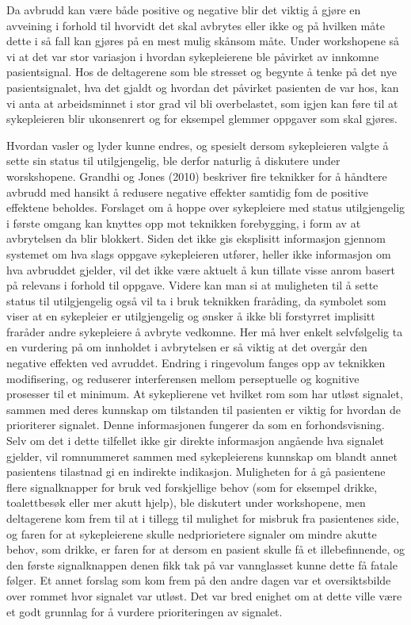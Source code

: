 \noindent
Da avbrudd kan være både positive og negative blir det viktig å gjøre en avveining i forhold til hvorvidt det skal avbrytes eller ikke og på hvilken måte dette i så fall kan gjøres på en mest mulig skånsom måte. Under workshopene så vi at det var stor variasjon i hvordan sykepleierene ble påvirket av innkomne pasientsignal. Hos de deltagerene som ble stresset og begynte å tenke på det nye pasientsignalet, hva det gjaldt og hvordan det påvirket pasienten de var hos, kan vi anta at arbeidsminnet i stor grad vil bli overbelastet, som igjen kan føre til at sykepleieren blir ukonsenrert og for eksempel glemmer oppgaver som skal gjøres. 

\noindent
Hvordan vasler og lyder kunne endres, og spesielt dersom sykepleieren valgte å sette sin status til utilgjengelig, ble derfor naturlig å diskutere under worskshopene. Grandhi og Jones (2010) beskriver fire teknikker for å håndtere avbrudd med hansikt å redusere negative effekter samtidig fom de positive effektene beholdes. Forslaget om å hoppe over sykepleiere med status utilgjengelig i første omgang kan knyttes opp mot teknikken forebygging, i form av at avbrytelsen da blir blokkert. Siden det ikke gis eksplisitt informasjon gjennom systemet om hva slags oppgave sykepleieren utfører, heller ikke informasjon om hva avbruddet gjelder, vil det ikke være aktuelt å kun tillate visse anrom basert på relevans i forhold til oppgave. Videre kan man si at muligheten til å sette status til utilgjengelig også vil ta i bruk teknikken fraråding, da symbolet som viser at en sykepleier er utilgjengelig og ønsker å ikke bli forstyrret implisitt fraråder andre sykepleiere å avbryte vedkomne. Her må hver enkelt selvfølgelig ta en vurdering på om innholdet i avbrytelsen er så viktig at det overgår den negative effekten ved avruddet. Endring i ringevolum fanges opp av teknikken modifisering, og reduserer interferensen mellom perseptuelle og kognitive prosesser til et minimum.
At sykeplierene vet hvilket rom som har utløst signalet, sammen med deres kunnskap om tilstanden til pasienten er viktig for hvordan de prioriterer signalet. Denne informasjonen fungerer da som en forhondsvisning. Selv om det i dette tilfellet ikke gir direkte informasjon angående hva signalet gjelder, vil romnummeret sammen med sykepleierens kunnskap om blandt annet pasientens tilastnad gi en indirekte indikasjon. Muligheten for å gå pasientene flere signalknapper for bruk ved forskjellige behov (som for eksempel drikke, toalettbesøk eller mer akutt hjelp), ble diskutert under workshopene, men deltagerene kom frem til at i tillegg til mulighet for misbruk fra pasientenes side, og faren for at sykepleierene skulle nedpriorietere signaler om mindre akutte behov, som drikke, er faren for at dersom en pasient skulle få et illebefinnende, og den første signalknappen denen fikk tak på var vannglasset kunne dette få fatale følger. Et annet forslag som kom frem på den andre dagen var et oversiktsbilde over rommet hvor signalet var utløst. Det var bred enighet om at dette ville være et godt grunnlag for å vurdere prioriteringen av signalet.   

